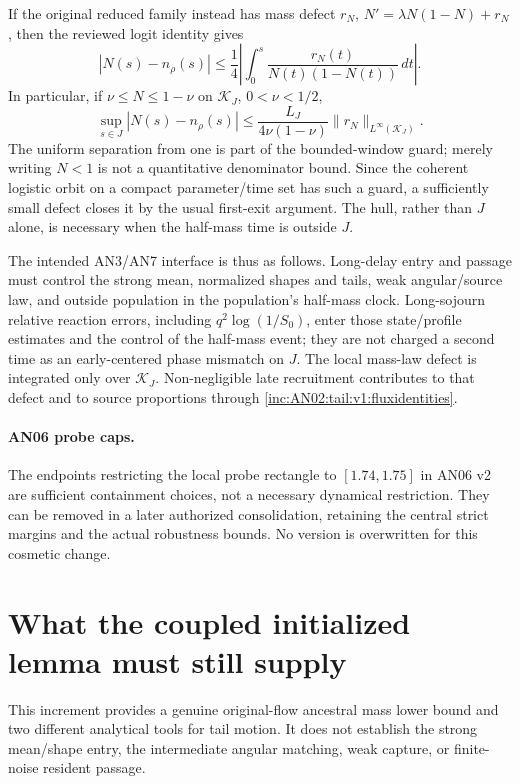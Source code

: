 \documentclass[11pt]{article}
\numberwithin{equation}{section}
\theoremstyle{remark}\newtheorem{remark}[theorem]{Remark}
\newcommand{\dd}{\,d}
\newcommand{\1}{\mathbf 1}
\begin{document}
If the original reduced family instead has mass defect $r_N$,
$N'=\lambda N(1-N)+r_N$, then the reviewed logit identity gives
\begin{equation}\label{inc:AN02:tail:v1:windowclock}
 |N(s)-n_\rho(s)|\le\frac14
 \left|\int_0^s\frac{r_N(t)}{N(t)(1-N(t))}\dd t\right|.
\end{equation}
In particular, if $\nu\le N\le1-\nu$ on $\mathcal K_J$, $0<\nu<1/2$,
\begin{equation}\label{inc:AN02:tail:v1:windowclockbound}
 \sup_{s\in J}|N(s)-n_\rho(s)|
 \le\frac{L_J}{4\nu(1-\nu)}\|r_N\|_{L^\infty(\mathcal K_J)}.
\end{equation}
The uniform separation from one is part of the bounded-window guard;
merely writing $N<1$ is not a quantitative denominator bound. Since the
coherent logistic orbit on a compact parameter/time set has such a guard,
a sufficiently small defect closes it by the usual first-exit argument.
The hull, rather than $J$ alone, is necessary when the half-mass time is
outside $J$.

The intended AN3/AN7 interface is thus as follows. Long-delay entry and
passage must control the strong mean, normalized shapes and tails, weak
angular/source law, and outside population in the population's half-mass
clock. Long-sojourn relative reaction errors, including
$q^2\log(1/S_0)$, enter those state/profile estimates and the control of the
half-mass event; they are not charged a second time as an early-centered
phase mismatch on $J$. The local mass-law defect is integrated only over
$\mathcal K_J$. Non-negligible late recruitment contributes to that defect
and to source proportions through \eqref{inc:AN02:tail:v1:fluxidentities}.

\paragraph{AN06 probe caps.}
The endpoints restricting the local probe rectangle to $[1.74,1.75]$ in
AN06 v2 are sufficient containment choices, not a necessary dynamical
restriction. They can be removed in a later authorized consolidation,
retaining the central strict margins and the actual robustness bounds.
No version is overwritten for this cosmetic change.

\section{What the coupled initialized lemma must still supply}
\label{inc:AN02:tail:v1:remaining}
This increment provides a genuine original-flow ancestral mass lower
bound and two different analytical tools for tail motion. It does not
establish the strong mean/shape entry, the intermediate angular matching,
weak capture, or finite-noise resident passage.
\end{document}
